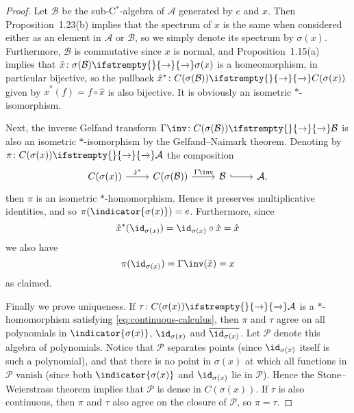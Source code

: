 \documentclass[article, a4paper, 11pt, oneside]{memoir}
\numberwithin{equation}{chapter}
\newcommand{\calB}{\mathcal{B}}
\newcommand{\calA}{\mathcal{A}}
\newcommand{\calP}{\mathcal{P}}
\renewcommand\to[1][]{%
    \ifstrempty{#1}{%
        \rightarrow
    }{%
        \xrightarrow[#1]{}
    }%
}
\begin{document}
\begin{proof}
    Let $\calB$ be the sub-C$^*$-algebra of $\calA$ generated by $e$ and $x$. Then Proposition~1.23(b) implies that the spectrum of $x$ is the same when considered either as an element in $\calA$ or $\calB$, so we simply denote its spectrum by $\sigma(x)$. Furthermore, $\calB$ is commutative since $x$ is normal, and Proposition~1.15(a) implies that $\hat{x} \colon \sigma(\calB) \to \sigma(x)$ is a homeomorphism, in particular bijective, so the pullback $\hat{x}^* \colon C(\sigma(\calB)) \to C(\sigma(x))$ given by $\hat{x}^*(f) = f \circ \hat{x}$ is also bijective. It is obviously an isometric $*$-isomorphism.

    Next, the inverse Gelfand transform $\Gamma\inv \colon C(\sigma(\calB)) \to \calB$ is also an isometric $*$-isomorphism by the Gelfand--Naimark theorem. Denoting by $\pi \colon C(\sigma(x)) \to \calA$ the composition
    \begin{equation*}
        \begin{tikzcd}
            C(\sigma(x))
                \ar[r, "\hat{x}^*"]
            & C(\sigma(\calB))
                \ar[r, "\Gamma\inv"]
            & \calB
                \ar[r, hookrightarrow]
            & \calA,
        \end{tikzcd}
    \end{equation*}
    then $\pi$ is an isometric $*$-homomorphism. Hence it preserves multiplicative identities, and so $\pi(\indicator{\sigma(x)}) = e$. Furthermore, since
    \begin{equation*}
        \hat{x}^*(\id_{\sigma(x)})
            = \id_{\sigma(x)} \circ \hat{x}
            = \hat{x}
    \end{equation*}
    we also have
    \begin{equation*}
        \pi(\id_{\sigma(x)})
            = \Gamma\inv(\hat{x})
            = x
    \end{equation*}
    as claimed.

    Finally we prove uniqueness. If $\tau \colon C(\sigma(x)) \to \calA$ is a $*$-homomorphism satisfying \cref{eq:continuous-calculus}, then $\pi$ and $\tau$ agree on all polynomials in $\indicator{\sigma(x)}$, $\id_{\sigma(x)}$ and $\overline{\id_{\sigma(x)}}$. Let $\calP$ denote this algebra of polynomials. Notice that $\calP$ separates points (since $\id_{\sigma(x)}$ itself is such a polynomial), and that there is no point in $\sigma(x)$ at which all functions in $\calP$ vanish (since both $\indicator{\sigma(x)}$ and $\id_{\sigma(x)}$ lie in $\calP$). Hence the Stone--Weierstrass theorem implies that $\calP$ is dense in $C(\sigma(x))$. If $\tau$ is also continuous, then $\pi$ and $\tau$ also agree on the closure of $\calP$, so $\pi = \tau$.
\end{proof}
\end{document}

